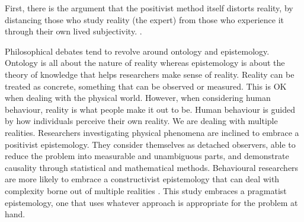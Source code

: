 
First, there is the argument that the positivist method itself distorts reality, by distancing those who study reality (the expert) from those who experience it through their own lived subjectivity. \citep{gaventa2007power}.

\citep{Research philosophy}

Philosophical debates tend to revolve around ontology and epistemology. Ontology is all about the nature of reality whereas epistemology is about the theory of knowledge that helps researchers make sense of reality. Reality can be treated as concrete, something that can be observed or measured. This is OK when dealing with the physical world. However, when considering human behaviour, reality is what people make it out to be. Human behaviour is guided by how individuals perceive their own reality. We are dealing with multiple realities. Researchers investigating physical phenomena are inclined to embrace a positivist epistemology. They consider themselves as detached observers, able to reduce the problem into measurable and unambiguous parts, and demonstrate causality through statistical and mathematical methods. Behavioural researchers are more likely to embrace a constructivist epistemology that can deal with complexity borne out of multiple realities \citep{easterby2015management}. This study embraces a pragmatist epistemology, one that uses whatever approach is appropriate for the problem at hand.


